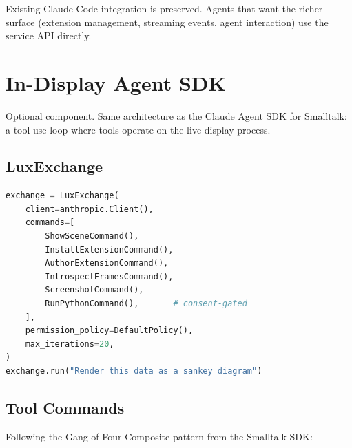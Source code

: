 \documentclass[a4paper,10pt]{article}
\begin{document}
Existing Claude Code integration is preserved.  Agents that want
the richer surface (extension management, streaming events,
agent interaction) use the service API directly.

\section{In-Display Agent SDK}

Optional component.  Same architecture as the Claude Agent SDK for
Smalltalk: a tool-use loop where tools operate on the live display
process.

\subsection{LuxExchange}

\begin{lstlisting}[language=Python]
exchange = LuxExchange(
    client=anthropic.Client(),
    commands=[
        ShowSceneCommand(),
        InstallExtensionCommand(),
        AuthorExtensionCommand(),
        IntrospectFramesCommand(),
        ScreenshotCommand(),
        RunPythonCommand(),       # consent-gated
    ],
    permission_policy=DefaultPolicy(),
    max_iterations=20,
)
exchange.run("Render this data as a sankey diagram")
\end{lstlisting}

\subsection{Tool Commands}

Following the Gang-of-Four Composite pattern from the Smalltalk SDK:
\end{document}
